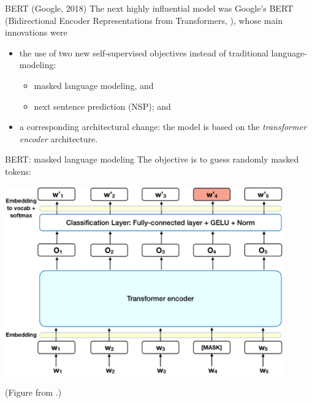 \documentclass[style=upen, size=14pt]{powerdot}
\theoremstyle{definition}
\begin{document}
\begin{slide}[toc=BERT]{BERT (Google, 2018)}
  The next highly influential model was Google's BERT (Bidirectional Encoder
  Representations from Transformers, \cite{devlin2018bert}), whose main
  innovations were
  \begin{itemize}
  \item the use of two new self-supervised objectives instead of traditional
    language-modeling:
    \begin{itemize}
    \item masked language modeling, and
    \item next sentence prediction (NSP); and
    \end{itemize}
  \item a corresponding architectural change: the model is based on the
    \emph{transformer encoder} architecture.
  \end{itemize}
\end{slide}

\begin{slide}[toc=]{BERT: masked language modeling}
  The objective is to guess randomly masked tokens:\medskip
  
  \begin{centering}
    
    \includegraphics[width=0.9\textwidth]{figures/bert1.eps}

    \footnotesize{(Figure from \cite{horev2018bert}.)}
    
  \end{centering}
\end{slide}
\end{document}
